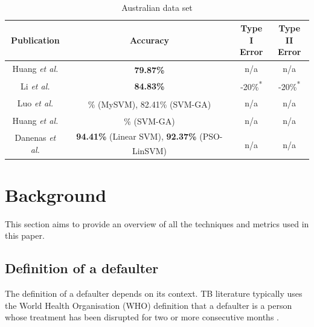 \documentclass{sig-alternate-05-2015}
\begin{document}
	\begin{table}
		\small
		\caption{Australian data set\textsuperscript{\textparagraph}}
		\label{table:australian_dataset}	
		\begin{tabular}{c|c|c|c} \hline		
			Publication&Accuracy&\parbox[t]{1.2cm}{\centering Type I\\Error}&\parbox[t]{1.2cm}{\centering Type II\\Error}\rule{0pt}{3mm}\rule[-0mm]{0pt}{0pt}\\ \hline
			\parbox[t]{2.3cm}{Huang \textit{et al.} \cite{Huang2004543}}
			&\parbox[t]{2.3cm}{\centering \textbf{79.87\%}\textsuperscript{\textdagger}}
			&\parbox[t]{1.1cm}{\centering n/a}
			&\parbox[t]{1.2cm}{\centering n/a}\rule{0pt}{3.5mm}\rule[-0mm]{0pt}{0pt}\\ \hline
			\parbox[t]{2.3cm}{Li \textit{et al.} \cite{Li2006772}}
			&\parbox[t]{2.3cm}{\centering \textbf{84.83\%}}
			&\parbox[t]{1.1cm}{-20\%\textsuperscript{*}}
			&\parbox[t]{1.2cm}{-20\%\textsuperscript{*}}\\ \hline
			\parbox[t]{2.3cm}{Luo \textit{et al.} \cite{Luo20097562}}
			&\parbox[t]{2.3cm}{\% (MySVM), 82.41\% (SVM-GA)\textsuperscript{\textdagger}}
			&\parbox[t]{1.1cm}{\centering n/a}
			&\parbox[t]{1.2cm}{\centering n/a}\rule{0pt}{3.5mm}\rule[-0mm]{0pt}{0pt}\\ \hline
			\parbox[t]{2.3cm}{Huang \textit{et al.} \cite{Huang2007847}}
			&\parbox[t]{2.3cm}{\% (SVM-GA)\textsuperscript{\textdagger}}
			&\parbox[t]{1.1cm}{\centering n/a}
			&\parbox[t]{1.2cm}{\centering n/a}\rule{0pt}{3.5mm}\rule[-0mm]{0pt}{0pt}\\ \hline
			\parbox[t]{2.3cm}{Danenas \textit{et al.} \cite{Danenas20153194}}
			&\parbox[t]{2.3cm}{\centering \textbf{94.41\%} (Linear SVM), \textbf{92.37\%} (PSO-LinSVM)\textsuperscript{\textdagger}}
			&\parbox[t]{1.1cm}{\centering n/a\textsuperscript{\textdaggerdbl}}
			&\parbox[t]{1.2cm}{\centering n/a\textsuperscript{\textdaggerdbl}}\rule{0pt}{3.5mm}\rule[-8mm]{0pt}{0pt}		
		\end{tabular}		
	\end{table}

	
	\section{Background}
	This section aims to provide an overview of all the techniques and metrics used in this paper.
	\subsection{Definition of a defaulter}
	The definition of a defaulter depends on its context. TB literature typically uses the World Health Organisation (WHO) definition that a defaulter is a person whose treatment has been disrupted for two or more consecutive months \cite{chan:2003prevalence, cherkaoui:19326203, Jha:10.1371/journal.pone.0008873,jittimanee:10.1111/j.1440-172X.2007.00650.x,muture:6660173120110101, world2015TB}.
	
\end{document}
